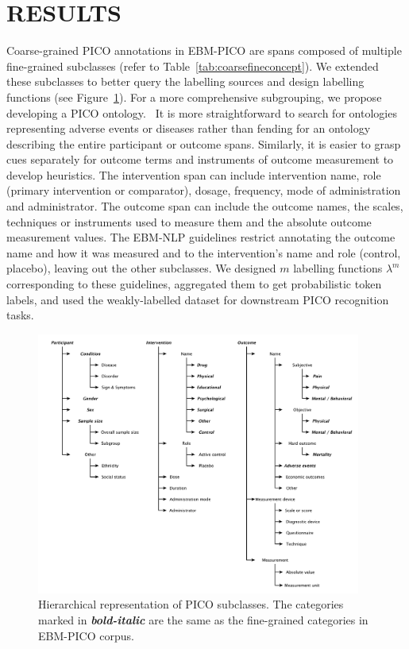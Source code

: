 \documentclass[10.7pt,]{article}
\begin{document}
\section{RESULTS}\label{results}
%
Coarse-grained PICO annotations in EBM-PICO are spans composed of multiple fine-grained subclasses (refer to Table~\ref{tab:coarsefineconcept}).
We extended these subclasses to better query the labelling sources and design labelling functions (see Figure~\ref{fig:target_subgroups}).
For a more comprehensive subgrouping, we propose developing a PICO ontology.~\cite{sanchez2022annotated}
It is more straightforward to search for ontologies representing adverse events or diseases rather than fending for an ontology describing the entire participant or outcome spans.
Similarly, it is easier to grasp cues separately for outcome terms and instruments of outcome measurement to develop heuristics.
The intervention span can include intervention name, role (primary intervention or comparator), dosage, frequency, mode of administration and administrator.
The outcome span can include the outcome names, the scales, techniques or instruments used to measure them and the absolute outcome measurement values.
The EBM-NLP guidelines restrict annotating the outcome name and how it was measured and to the intervention's name and role (control, placebo), leaving out the other subclasses.
We designed $m$ labelling functions $\lambda^{m}$ corresponding to these guidelines, aggregated them to get probabilistic token labels, and used the weakly-labelled dataset for downstream PICO recognition tasks.
%
\begin{figure}[ht]
\centering
\includegraphics[width=0.95\textwidth]{figures/target_subgroups_.pdf}
\caption{\label{fig:target_subgroups} Hierarchical representation of PICO subclasses. The categories marked in \textbf{\textit{bold-italic}} are the same as the fine-grained categories in EBM-PICO corpus.}
\end{figure}
\end{document}
